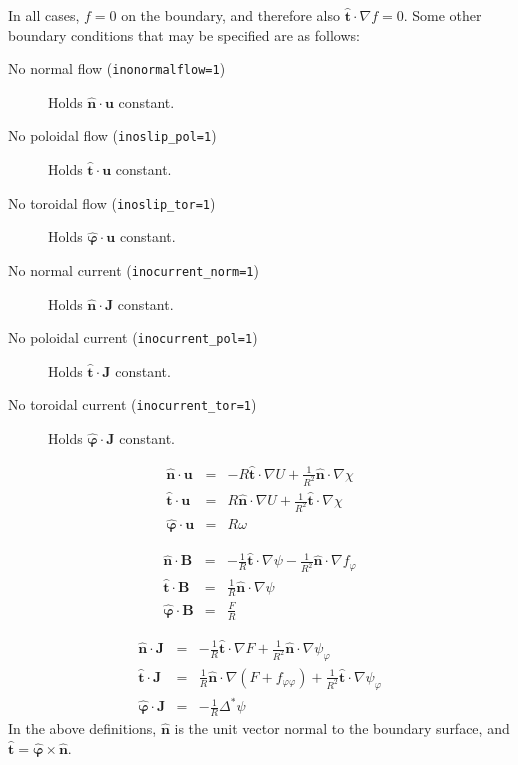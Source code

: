 \documentclass[letterpaper]{book}
\renewcommand{\vec}[1]{\ensuremath{\mathbf{#1}}}
\newcommand{\tor}{\varphi}              %
\newcommand{\B}{\vec{B}}
\renewcommand{\u}{\vec{u}}
\renewcommand{\j}{\vec{J}}
\newcommand{\grad}[1]{\nabla #1}
\newcommand{\gs}[1]{\Delta^* #1}
\newcommand{\uvec}[1]{\ensuremath{\vec{\hat{#1}}}}
\begin{document}
In all cases, $f = 0$ on the boundary, and therefore also $\uvec{t}
\cdot \grad{f} = 0$.  Some other boundary conditions that may be
specified are as follows:

\begin{description}
\item[No normal flow (\texttt{inonormalflow=1})] Holds $\uvec{n} \cdot
  \u$ constant.
\item[No poloidal flow (\texttt{inoslip\_pol=1})] Holds $\uvec{t} \cdot
  \u$ constant.
\item[No toroidal flow (\texttt{inoslip\_tor=1})] Holds $\uvec{\tor}
  \cdot \u$ constant.
\item[No normal current (\texttt{inocurrent\_norm=1})] Holds $\uvec{n} \cdot
  \j$ constant.
\item[No poloidal current (\texttt{inocurrent\_pol=1})] Holds $\uvec{t} \cdot
  \j$ constant.
\item[No toroidal current (\texttt{inocurrent\_tor=1})] Holds $\uvec{\tor}
  \cdot \j$ constant.
\end{description}

\begin{eqnarray}
  \uvec{n} \cdot \u & = & 
  -R \uvec{t}\cdot\grad{U}+ \frac{1}{R^2} \uvec{n} \cdot \grad{\chi}
  \\
  \uvec{t} \cdot \u & = & 
  R \uvec{n}\cdot\grad{U} + \frac{1}{R^2} \uvec{t} \cdot \grad{\chi}
  \\
  \uvec{\tor} \cdot \u & = & R \omega
\end{eqnarray}

\begin{eqnarray}
  \uvec{n} \cdot \B & = & 
  -\frac{1}{R} \uvec{t}\cdot\grad{\psi}
  - \frac{1}{R^2} \uvec{n} \cdot \grad{f_\tor}
  \\
  \uvec{t} \cdot \B & = & 
  \frac{1}{R} \uvec{n}\cdot\grad{\psi} 
  \\
  \uvec{\tor} \cdot \B & = & \frac{F}{R}
\end{eqnarray}

\begin{eqnarray}
  \uvec{n} \cdot \j & = & 
  -\frac{1}{R} \uvec{t} \cdot \grad{F}
  + \frac{1}{R^2} \uvec{n} \cdot \grad{\psi_\tor}
  \\
  \uvec{t} \cdot \j & = & 
  \frac{1}{R} \uvec{n}\cdot\grad{(F + f_{\tor \tor})} 
  + \frac{1}{R^2} \uvec{t} \cdot \grad{\psi_\tor}
  \\
  \uvec{\tor} \cdot \j & = & -\frac{1}{R}\gs{\psi}
\end{eqnarray}
In the above definitions, $\uvec{n}$ is the unit vector normal to the
boundary surface, and $\uvec{t} = \uvec{\tor} \times \uvec{n}$.
\end{document}
